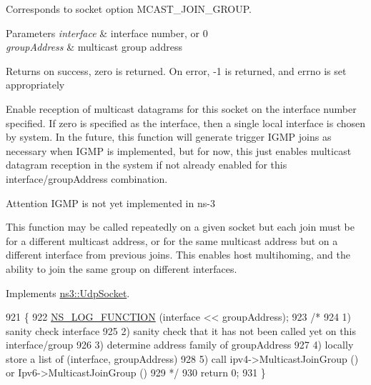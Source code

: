 Corresponds to socket option M\+C\+A\+S\+T\+\_\+\+J\+O\+I\+N\+\_\+\+G\+R\+O\+UP. 


\begin{DoxyParams}{Parameters}
{\em interface} & interface number, or 0 \\
\hline
{\em group\+Address} & multicast group address \\
\hline
\end{DoxyParams}
\begin{DoxyReturn}{Returns}
on success, zero is returned. On error, -\/1 is returned, and errno is set appropriately
\end{DoxyReturn}
Enable reception of multicast datagrams for this socket on the interface number specified. If zero is specified as the interface, then a single local interface is chosen by system. In the future, this function will generate trigger I\+G\+MP joins as necessary when I\+G\+MP is implemented, but for now, this just enables multicast datagram reception in the system if not already enabled for this interface/group\+Address combination.

\begin{DoxyAttention}{Attention}
I\+G\+MP is not yet implemented in ns-\/3
\end{DoxyAttention}
This function may be called repeatedly on a given socket but each join must be for a different multicast address, or for the same multicast address but on a different interface from previous joins. This enables host multihoming, and the ability to join the same group on different interfaces. 

Implements \hyperlink{classns3_1_1UdpSocket_a3aa48fac00edf4dbd519a6fc7644f0b7}{ns3\+::\+Udp\+Socket}.


\begin{DoxyCode}
921 \{
922   \hyperlink{log-macros-disabled_8h_a90b90d5bad1f39cb1b64923ea94c0761}{NS\_LOG\_FUNCTION} (interface << groupAddress);
923   \textcolor{comment}{/*}
924 \textcolor{comment}{   1) sanity check interface}
925 \textcolor{comment}{   2) sanity check that it has not been called yet on this interface/group}
926 \textcolor{comment}{   3) determine address family of groupAddress}
927 \textcolor{comment}{   4) locally store a list of (interface, groupAddress)}
928 \textcolor{comment}{   5) call ipv4->MulticastJoinGroup () or Ipv6->MulticastJoinGroup ()}
929 \textcolor{comment}{  */}
930   \textcolor{keywordflow}{return} 0;
931 \} 
\end{DoxyCode}

